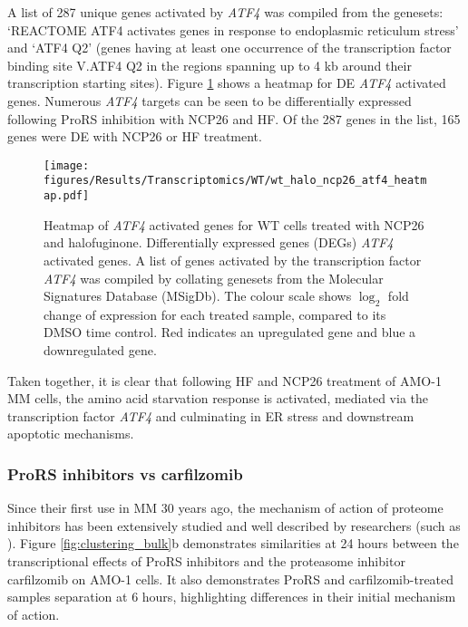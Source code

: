 A list of 287 unique genes activated by \textit{ATF4} was compiled from the genesets: `REACTOME ATF4 activates genes in response to endoplasmic reticulum stress' and `ATF4 Q2' (genes having at least one occurrence of the transcription factor binding site V.ATF4 Q2 in the regions spanning up to 4 kb around their transcription starting sites).
Figure \ref{fig:wt_atf4_heatmap} shows a heatmap for DE \textit{ATF4} activated genes.
Numerous \textit{ATF4} targets can be seen to be differentially expressed following ProRS inhibition with NCP26 and HF.
Of the 287 genes in the list, 165 genes were DE with NCP26 or HF treatment.


\begin{figure}[p]
\centering
\texttt{[image: figures/Results/Transcriptomics/WT/wt\_halo\_ncp26\_atf4\_heatmap.pdf]}
\caption[\textit{ATF4} activated genes heatmap- WT cells]{Heatmap of \textit{ATF4} activated genes for WT cells treated with NCP26 and halofuginone.
Differentially expressed genes (DEGs) \textit{ATF4} activated genes.
A list of genes activated by the transcription factor \textit{ATF4} was compiled by collating genesets from the Molecular Signatures Database (MSigDb).
The colour scale shows $\log_{2}$ fold change of expression for each treated sample, compared to its DMSO time control.
Red indicates an upregulated gene and blue a downregulated gene.
}
\label{fig:wt_atf4_heatmap}
\end{figure}

Taken together, it is clear that following HF and NCP26 treatment of AMO-1 MM cells, the amino acid starvation response is activated, mediated via the transcription factor \textit{ATF4} and culminating in ER stress and downstream apoptotic mechanisms.

\subsubsection{ProRS inhibitors vs carfilzomib}
Since their first use in MM 30 years ago, the mechanism of action of proteome inhibitors has been extensively studied and well described by researchers (such as \cite{nunes2017proteasome}).
Figure \ref{fig:clustering_bulk}b demonstrates similarities at 24 hours between the transcriptional effects of ProRS inhibitors and the proteasome inhibitor carfilzomib on AMO-1 cells.
It also demonstrates ProRS and carfilzomib-treated samples separation at 6 hours, highlighting differences in their initial mechanism of action.

